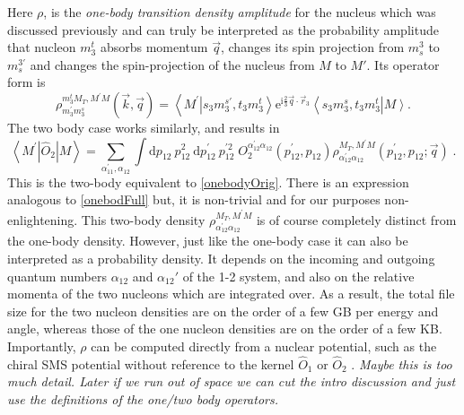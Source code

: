 \documentclass[a4paper,11pt]{article}
\newcommand\bv[1]{\vec{#1}}
\newcommand{\ques}[1]{\color{red}\textit{ #1 }\color{black}}
\begin{document}
Here $\rho$, is the \textit{one-body transition density amplitude}
for the nucleus which was discussed previously and can truly be
interpreted as the probability amplitude that nucleon $m_3^t$ absorbs
momentum $\bv{q}$, changes its spin projection from $m_s^3$ to
$m_s^{3'}$ and changes the spin-projection of the nucleus from $M$ to
$M'$. Its operator form is
\begin{equation}
  \rho_{m_{3}^{\prime} m_{3}^{s}}^{m_{3}^{t} M_{T}, M^{\prime}
  M}(\bv{k}, \bv{q})=\left\langle M^{\prime}\right.\left|s_{3}
  m_{3}^{s \prime}, t_{3} m_{3}^{t}\right\rangle
  \mathrm{e}^{\mathrm{i} \frac{2}{3} \bv{q} \cdot
  \bv{r}_{3}}\left\langle s_{3} m_{3}^{s}, t_{3}
  m_{3}^{t}\right|\left. M\right\rangle\label{onebodydens}.
\end{equation}
The two body case works similarly, and results in
\begin{equation}
  \left\langle M^{\prime}\left|\hat{O}_{2}\right| M\right\rangle =
  \sum_{\alpha_{11}^{\prime}, \alpha_{12}} \int \mathrm{d} p_{12}\:
  p_{12}^{2} \mathrm{~d} p_{12}^{\prime}\: p_{12}^{\prime 2}\;
  O_{2}^{\alpha_{12}^{\prime} \alpha_{12}}\left(p_{12}^{\prime},
  p_{12}\right) \rho_{\alpha_{12}^{\prime} \alpha_{12}}^{M_{T},
  M^{\prime} M}\left(p_{12}^{\prime}, p_{12} ; \bv{q}\right)\label{twobody}\;.
\end{equation}
This is the two-body equivalent to \eqref{onebodyOrig}.
There is an expression analogous to \eqref{onebodFull} but, it is non-trivial and for our purposes non-enlightening.
This two-body density $\rho_{\alpha_{12}^{\prime}
\alpha_{12}}^{M_{T}, M^{\prime} M}$ is of course completely distinct
from the one-body density. 
However, just like the one-body case it can also be interpreted as a probability density.
It depends on the incoming and outgoing quantum numbers
$\alpha_{12}$ and $\alpha_{12}'$ of the 1-2 system, and also on the
relative momenta of the two nucleons which are integrated over.
As a result, the total file size for the two nucleon densities are on
the order of a few GB per energy and angle, whereas those of the one
nucleon densities are on the order of a few KB.
Importantly, $\rho$ can be computed directly from a nuclear
potential, such as the chiral SMS potential
without reference to the kernel $\hat{O}_1$ or $\hat{O}_{2}$
\cite{Reinert2018}.
\ques{Maybe this is too much detail. Later if we run out of space we can cut the intro discussion and just use the definitions
of the one/two body operators.}
\end{document}
